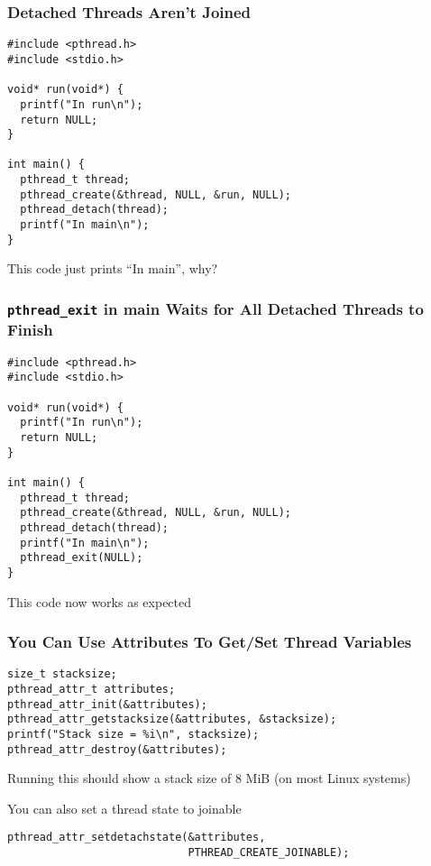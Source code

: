   \begin{frame}[fragile]
    \frametitle{Detached Threads Aren't Joined}

    \begin{lstlisting}
#include <pthread.h>
#include <stdio.h>

void* run(void*) {
  printf("In run\n");
  return NULL;
}

int main() {
  pthread_t thread;
  pthread_create(&thread, NULL, &run, NULL);
  pthread_detach(thread);
  printf("In main\n");
}
    \end{lstlisting}

    This code just prints ``In main'', why?
  \end{frame}

  \begin{frame}[fragile]
    \frametitle{\texttt{pthread\_exit} in main Waits for All Detached Threads to Finish}

    \begin{lstlisting}
#include <pthread.h>
#include <stdio.h>

void* run(void*) {
  printf("In run\n");
  return NULL;
}

int main() {
  pthread_t thread;
  pthread_create(&thread, NULL, &run, NULL);
  pthread_detach(thread);
  printf("In main\n");
  pthread_exit(NULL);
}
    \end{lstlisting}

    This code now works as expected
  \end{frame}

  \begin{frame}[fragile]
    \frametitle{You Can Use Attributes To Get/Set Thread Variables}

    \begin{lstlisting}
size_t stacksize;
pthread_attr_t attributes;
pthread_attr_init(&attributes);
pthread_attr_getstacksize(&attributes, &stacksize);
printf("Stack size = %i\n", stacksize);
pthread_attr_destroy(&attributes);
    \end{lstlisting}

    \vspace{2em}

    Running this should show a stack size of 8 MiB (on most Linux systems)

    \vspace{2em}

    You can also set a thread state to joinable

    \begin{lstlisting}
pthread_attr_setdetachstate(&attributes,
                            PTHREAD_CREATE_JOINABLE);
    \end{lstlisting}

  \end{frame}

